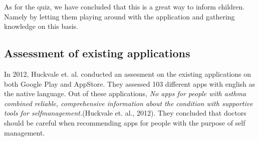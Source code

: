 As for the quiz, we have concluded that this is a great way to inform children. Namely by letting them playing around with the application and gathering knowledge on this basis. 

\subsection{Assessment of existing applications}
In 2012, Huckvale et. al. \cite{huckvale2012apps} conducted an assesment on the existing applications on both Google Play and AppStore. They assessed 103 different apps with english as the native language. Out of these applications, \emph{No apps for people with asthma combined reliable, comprehensive information about the condition with supportive tools for self­management.}(Huckvale et. al., 2012). They concluded that doctors should be careful when recommending apps for people with the purpose of self management. 




